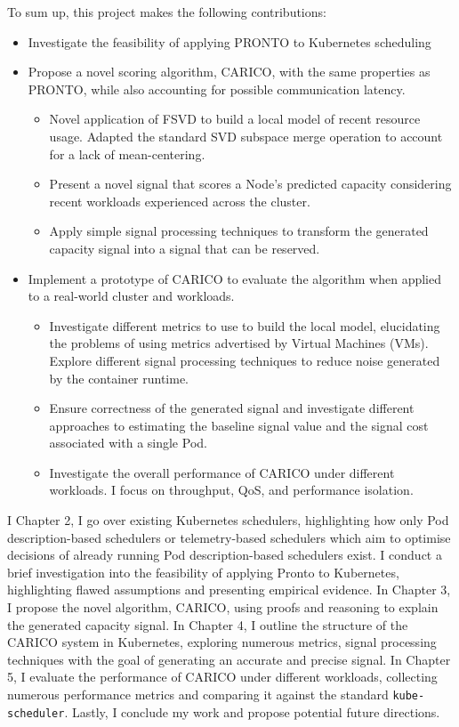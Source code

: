 To sum up, this project makes the following contributions:
\begin{itemize}
\item Investigate the feasibility of applying PRONTO to Kubernetes scheduling
\item Propose a novel scoring algorithm, CARICO, with the same properties as
    PRONTO, while also accounting for possible communication latency.
    \begin{itemize}
        \item Novel application of FSVD to build a local model of recent
            resource usage. Adapted the standard SVD subspace merge operation to
            account for a lack of mean-centering.
        \item Present a novel signal that scores a Node's predicted capacity
            considering recent workloads experienced across the cluster.
        \item Apply simple signal processing techniques to transform the
            generated capacity signal into a signal that can be reserved.
    \end{itemize}
\item Implement a prototype of CARICO to evaluate the algorithm when applied to
    a real-world cluster and workloads.
    \begin{itemize}
        \item Investigate different metrics to use to build the local model,
            elucidating the problems of using metrics advertised by Virtual
            Machines (VMs). Explore different signal processing techniques to
            reduce noise generated by the container runtime.
        \item Ensure correctness of the generated signal and investigate different
            approaches to estimating the baseline signal value and the signal
            cost associated with a single Pod.
        \item Investigate the overall performance of CARICO under different
            workloads. I focus on throughput, QoS, and performance isolation.
    \end{itemize}
\end{itemize}

I Chapter 2, I go over existing Kubernetes schedulers, highlighting how only Pod
description-based schedulers or telemetry-based schedulers which aim to optimise
decisions of already running Pod description-based schedulers exist. I conduct a
brief investigation into the feasibility of applying Pronto to Kubernetes,
highlighting flawed assumptions and presenting empirical evidence. In Chapter 3,
I propose the novel algorithm, CARICO, using proofs and reasoning to explain the
generated capacity signal. In Chapter 4, I outline the structure of the CARICO
system in Kubernetes, exploring  numerous metrics, signal processing techniques
with the goal of generating an accurate and precise signal. In Chapter 5, I
evaluate the performance of CARICO under different workloads, collecting
numerous performance metrics and comparing it against the standard
\verb|kube-scheduler|. Lastly, I conclude my work and propose potential future
directions.


